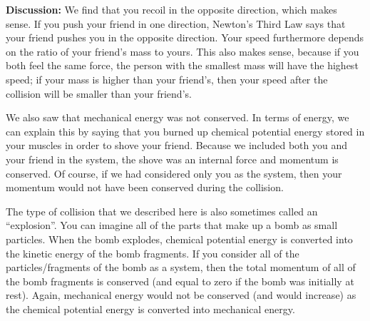 \begin{example}
\textbf{Discussion:} We find that you recoil in the opposite direction, which makes sense. If you push your friend in one direction, Newton's Third Law says that your friend pushes you in the opposite direction. Your speed furthermore depends on the ratio of your friend's mass to yours. This also makes sense, because if you both feel the same force, the person with the smallest mass will have the highest speed; if your mass is higher than your friend's, then your speed after the collision will be smaller than your friend's.

We also saw that mechanical energy was not conserved. In terms of energy, we can explain this by saying that you burned up chemical potential energy stored in your muscles in order to shove your friend. Because we included both you and your friend in the system, the shove was an internal force and momentum is conserved. Of course, if we had considered only you as the system, then your momentum would not have been conserved during the collision. 

The type of collision that we described here is also sometimes called an ``explosion''. You can imagine all of the parts that make up a bomb as small particles. When the bomb explodes, chemical potential energy is converted into the kinetic energy of the bomb fragments. If you consider all of the particles/fragments of the bomb as a system, then the total momentum of all of the bomb fragments is conserved (and equal to zero if the bomb was initially at rest). Again, mechanical energy would not be conserved (and would increase) as the chemical potential energy is converted into mechanical energy.
\end{example}
\vspace{-0.25cm}
